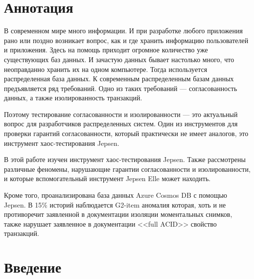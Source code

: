 \documentclass[12pt,  openany]{book}
\begin{document}
\chapter{Аннотация}
В современном мире много информации. И при разработке любого приложения рано или поздно возникает вопрос, как и где хранить информацию пользователей и приложения. Здесь на помощь приходит огромное количество уже существующих баз данных. И зачастую данных бывает настолько много, что неоправданно хранить их на одном компьютере. Тогда используется распределенная база данных. К современным распределенным базам данных предъявляется ряд требований. Одно из таких требований --- согласованность данных, а также изолированность транзакций.
\par Поэтому тестирование согласованности и изолированности --- это актуальный вопрос для разработчиков распределенных систем. Один из инструментов для проверки гарантий согласованности, который практически не имеет аналогов, это инструмент хаос-тестирования Jepsen. 
\par В этой работе изучен инструмент хаос-тестирования Jepsen.  Также рассмотрены различные феномены, нарушающие гарантии согласованности и изолированности, и которые вспомогательный инструмент Jepsen Elle может находить. 
\par Кроме того, проанализирована база данных Azure Cosmos DB с помощью Jepsen. В 15\% историй наблюдается G2-item аномалия которая, хоть и не противоречит заявленной в документации изоляции моментальных снимков, также нарушает заявленное в документации <<full ACID>> свойство транзакций.


\setcounter{page}{2}
\tableofcontents
\clearpage

\chapter{Введение}
\end{document}
